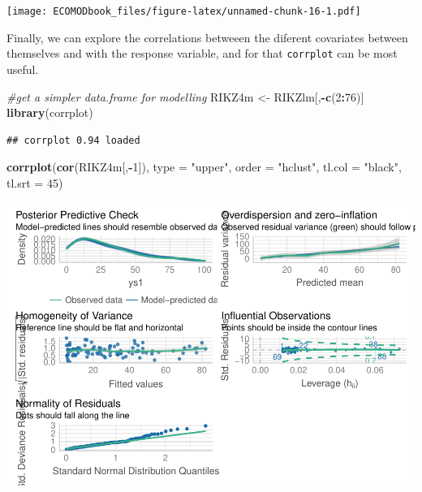 \documentclass[
]{book}
\newenvironment{Shaded}{\begin{snugshade}}{\end{snugshade}}
\newcommand{\AttributeTok}[1]{\textcolor[rgb]{0.13,0.29,0.53}{#1}}
\newcommand{\CommentTok}[1]{\textcolor[rgb]{0.56,0.35,0.01}{\textit{#1}}}
\newcommand{\DecValTok}[1]{\textcolor[rgb]{0.00,0.00,0.81}{#1}}
\newcommand{\FunctionTok}[1]{\textcolor[rgb]{0.13,0.29,0.53}{\textbf{#1}}}
\newcommand{\NormalTok}[1]{#1}
\newcommand{\OtherTok}[1]{\textcolor[rgb]{0.56,0.35,0.01}{#1}}
\newcommand{\SpecialCharTok}[1]{\textcolor[rgb]{0.81,0.36,0.00}{\textbf{#1}}}
\newcommand{\StringTok}[1]{\textcolor[rgb]{0.31,0.60,0.02}{#1}}
\begin{document}
\texttt{[image: ECOMODbook\_files/figure-latex/unnamed-chunk-16-1.pdf]}

Finally, we can explore the correlations betweeen the diferent covariates between themselves and with the response variable, and for that \texttt{corrplot} can be most useful.

\begin{Shaded}
\begin{Highlighting}[]
\CommentTok{\#get a simpler data.frame for modelling}
\NormalTok{RIKZ4m }\OtherTok{\textless{}{-}}\NormalTok{ RIKZlm[,}\SpecialCharTok{{-}}\FunctionTok{c}\NormalTok{(}\DecValTok{2}\SpecialCharTok{:}\DecValTok{76}\NormalTok{)]}
\FunctionTok{library}\NormalTok{(corrplot)}
\end{Highlighting}
\end{Shaded}

\begin{verbatim}
## corrplot 0.94 loaded
\end{verbatim}

\begin{Shaded}
\begin{Highlighting}[]
\FunctionTok{corrplot}\NormalTok{(}\FunctionTok{cor}\NormalTok{(RIKZ4m[,}\SpecialCharTok{{-}}\DecValTok{1}\NormalTok{]), }\AttributeTok{type =} \StringTok{"upper"}\NormalTok{, }\AttributeTok{order =} \StringTok{"hclust"}\NormalTok{, }\AttributeTok{tl.col =} \StringTok{"black"}\NormalTok{, }\AttributeTok{tl.srt =} \DecValTok{45}\NormalTok{)}
\end{Highlighting}
\end{Shaded}

\includegraphics{ECOMODbook_files/figure-latex/unnamed-chunk-17-1.pdf}
\end{document}
